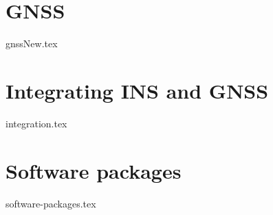 \graphicspath{{Theory/}}

\section{GNSS}
    {gnssNew.tex}

\section{Integrating INS and GNSS}
    {integration.tex}

\section{Software packages}
    {software-packages.tex}
    
    
